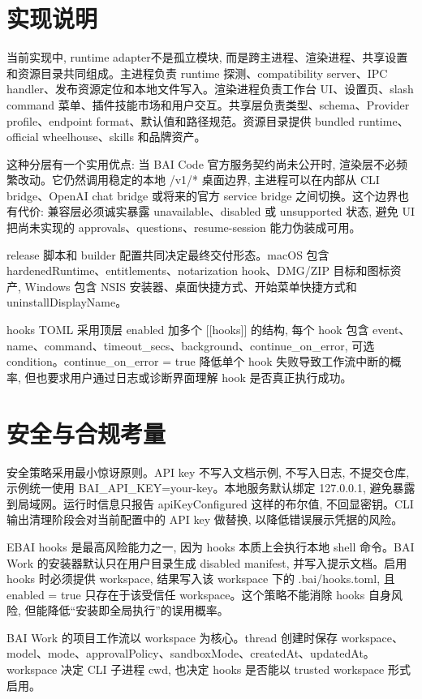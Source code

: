 \section{实现说明}
当前实现中, runtime adapter不是孤立模块, 而是跨主进程、渲染进程、共享设置和资源目录共同组成。主进程负责 runtime 探测、compatibility server、IPC handler、发布资源定位和本地文件写入。渲染进程负责工作台 UI、设置页、slash command 菜单、插件技能市场和用户交互。共享层负责类型、schema、Provider profile、endpoint format、默认值和路径规范。资源目录提供 bundled runtime、official wheelhouse、skills 和品牌资产。

这种分层有一个实用优点: 当 BAI Code 官方服务契约尚未公开时, 渲染层不必频繁改动。它仍然调用稳定的本地 /v1/* 桌面边界, 主进程可以在内部从 CLI bridge、OpenAI chat bridge 或将来的官方 service bridge 之间切换。这个边界也有代价: 兼容层必须诚实暴露 unavailable、disabled 或 unsupported 状态, 避免 UI 把尚未实现的 approvals、questions、resume-session 能力伪装成可用。

release 脚本和 builder 配置共同决定最终交付形态。macOS 包含 hardenedRuntime、entitlements、notarization hook、DMG/ZIP 目标和图标资产, Windows 包含 NSIS 安装器、桌面快捷方式、开始菜单快捷方式和 uninstallDisplayName。

hooks TOML 采用顶层 enabled 加多个 [[hooks]] 的结构, 每个 hook 包含 event、name、command、timeout\_secs、background、continue\_on\_error, 可选 condition。continue\_on\_error = true 降低单个 hook 失败导致工作流中断的概率, 但也要求用户通过日志或诊断界面理解 hook 是否真正执行成功。

\section{安全与合规考量}
安全策略采用最小惊讶原则。API key 不写入文档示例, 不写入日志, 不提交仓库, 示例统一使用 BAI\_API\_KEY=your-key。本地服务默认绑定 127.0.0.1, 避免暴露到局域网。运行时信息只报告 apiKeyConfigured 这样的布尔值, 不回显密钥。CLI 输出清理阶段会对当前配置中的 API key 做替换, 以降低错误展示凭据的风险。

EBAI hooks 是最高风险能力之一, 因为 hooks 本质上会执行本地 shell 命令。BAI Work 的安装器默认只在用户目录生成 disabled manifest, 并写入提示文档。启用 hooks 时必须提供 workspace, 结果写入该 workspace 下的 .bai/hooks.toml, 且 enabled = true 只存在于该受信任 workspace。这个策略不能消除 hooks 自身风险, 但能降低“安装即全局执行”的误用概率。

BAI Work 的项目工作流以 workspace 为核心。thread 创建时保存 workspace、model、mode、approvalPolicy、sandboxMode、createdAt、updatedAt。workspace 决定 CLI 子进程 cwd, 也决定 hooks 是否能以 trusted workspace 形式启用。

